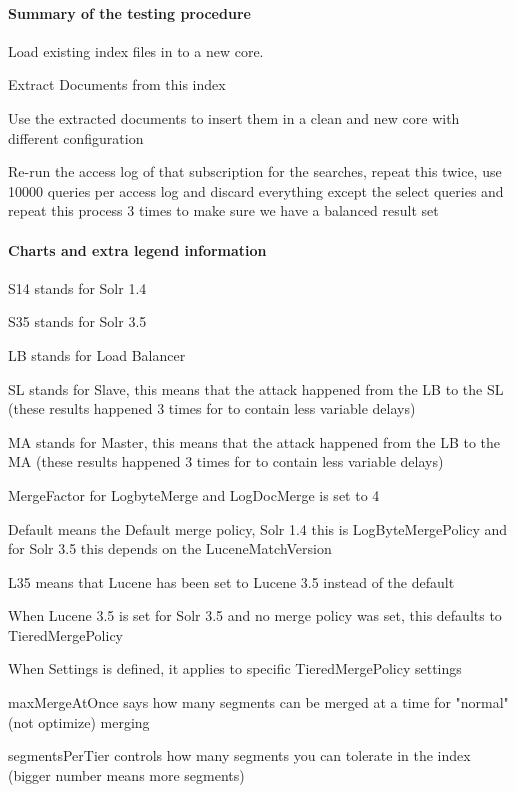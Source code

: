 \paragraph{Summary of the testing procedure}
\begin{packed_enumerate}
\item Load existing index files in to a new core.
\item Extract Documents from this index
\item Use the extracted documents to insert them in a clean and new core with different configuration
\item Re-run the access log of that subscription for the searches, repeat this twice, use 10000 queries per access log and discard everything except the select queries and repeat this process 3 times to make sure we have a balanced result set
\end{packed_enumerate}

\paragraph{Charts and extra legend information}
\begin{packed_itemize}
\item S14 stands for Solr 1.4
\item S35 stands for Solr 3.5
\item LB stands for Load Balancer
\item SL stands for Slave, this means that the attack happened from the LB to the SL (these results happened 3 times for to contain less variable delays)
\item MA stands for Master, this means that the attack happened from the LB to the MA (these results happened 3 times for to contain less variable delays)
\item MergeFactor for LogbyteMerge and LogDocMerge is set to 4
\item Default means the Default merge policy, Solr 1.4 this is LogByteMergePolicy and for Solr 3.5 this depends on the LuceneMatchVersion
\item L35 means that Lucene has been set to Lucene 3.5 instead of the default
\item When Lucene 3.5 is set for Solr 3.5 and no merge policy was set, this defaults to TieredMergePolicy
\item When Settings is defined, it applies to specific TieredMergePolicy settings
\begin{packed_enumerate}
\item maxMergeAtOnce says how many segments can be merged at a time for "normal" (not optimize) merging
\item segmentsPerTier controls how many segments you can tolerate in the index (bigger number means more segments)
\end{packed_enumerate}
\end{packed_itemize}

